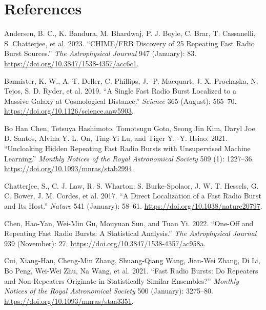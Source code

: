 \documentclass[
  rmp,
  amsmath,
  amssymb,
  preprint]{revtex4-2}
\newlength{\cslhangindent}
\newlength{\cslentryspacingunit} %
\newenvironment{CSLReferences}[2] %
 {%
  \setlength{\parindent}{0pt}
  \ifodd #1
  \let\oldpar\par
  \def\par{\hangindent=\cslhangindent\oldpar}
  \fi
  \setlength{\parskip}{#2\cslentryspacingunit}
 }%
 {}
\begin{document}
\hypertarget{references}{%
\section*{References}\label{references}}

\hypertarget{refs}{}
\begin{CSLReferences}{1}{0}
\leavevmode{}%
Andersen, B. C., K. Bandura, M. Bhardwaj, P. J. Boyle, C. Brar, T.
Cassanelli, S. Chatterjee, et al. 2023. {``{CHIME}/{FRB Discovery} of 25
{Repeating Fast Radio Burst Sources}.''} \emph{The Astrophysical
Journal} 947 (January): 83.
\url{https://doi.org/10.3847/1538-4357/acc6c1}.

\leavevmode{}%
Bannister, K. W., A. T. Deller, C. Phillips, J. -P. Macquart, J. X.
Prochaska, N. Tejos, S. D. Ryder, et al. 2019. {``A Single Fast Radio
Burst Localized to a Massive Galaxy at Cosmological Distance.''}
\emph{Science} 365 (August): 565--70.
\url{https://doi.org/10.1126/science.aaw5903}.

\leavevmode{}%
Bo Han Chen, Tetsuya Hashimoto, Tomotsugu Goto, Seong Jin Kim, Daryl Joe
D. Santos, Alvina Y. L. On, Ting-Yi Lu, and Tiger Y. -Y. Hsiao. 2021.
{``Uncloaking Hidden Repeating Fast Radio Bursts with Unsupervised
Machine Learning.''} \emph{Monthly Notices of the Royal Astronomical
Society} 509 (1): 1227--36.
\url{https://doi.org/10.1093/mnras/stab2994}.

\leavevmode{}%
Chatterjee, S., C. J. Law, R. S. Wharton, S. Burke-Spolaor, J. W. T.
Hessels, G. C. Bower, J. M. Cordes, et al. 2017. {``A Direct
Localization of a Fast Radio Burst and Its Host.''} \emph{Nature} 541
(January): 58--61. \url{https://doi.org/10.1038/nature20797}.

\leavevmode{}%
Chen, Hao-Yan, Wei-Min Gu, Mouyuan Sun, and Tuan Yi. 2022. {``One-Off
and {Repeating Fast Radio Bursts}: {A Statistical Analysis}.''}
\emph{The Astrophysical Journal} 939 (November): 27.
\url{https://doi.org/10.3847/1538-4357/ac958a}.

\leavevmode{}%
Cui, Xiang-Han, Cheng-Min Zhang, Shuang-Qiang Wang, Jian-Wei Zhang, Di
Li, Bo Peng, Wei-Wei Zhu, Na Wang, et al. 2021. {``Fast Radio Bursts: Do
Repeaters and Non-Repeaters Originate in Statistically Similar
Ensembles?''} \emph{Monthly Notices of the Royal Astronomical Society}
500 (January): 3275--80. \url{https://doi.org/10.1093/mnras/staa3351}.


\end{CSLReferences}
\end{document}
